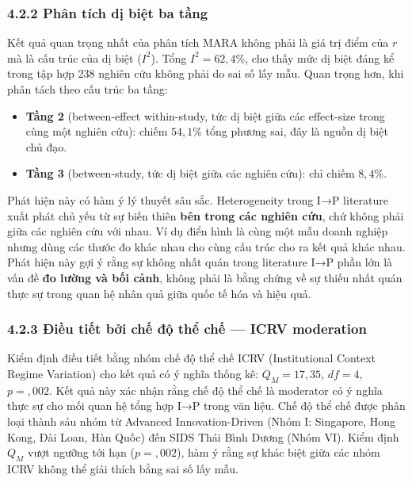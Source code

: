 \documentclass[12pt,a4paper]{article}
\providecommand{\tightlist}{\setlength{\itemsep}{0pt}\setlength{\parskip}{0pt}}
\begin{document}
\hypertarget{422-phuxe2n-tuxedch-dux1ecb-biux1ec7t-ba-tux1ea7ng}{%
\subsubsection{4.2.2 Phân tích dị biệt ba
tầng}\label{422-phuxe2n-tuxedch-dux1ecb-biux1ec7t-ba-tux1ea7ng}}

Kết quả quan trọng nhất của phân tích MARA không phải là giá trị điểm
của \(r\) mà là cấu trúc của dị biệt (\(I^2\)). Tổng \(I^2 = 62{,}4\%\),
cho thấy mức dị biệt đáng kể trong tập hợp 238 nghiên cứu không phải do
sai số lấy mẫu. Quan trọng hơn, khi phân tách theo cấu trúc ba tầng:

\begin{itemize}
\tightlist
\item
  \textbf{Tầng 2} (between-effect within-study, tức dị biệt giữa các
  effect-size trong cùng một nghiên cứu): chiếm \(54{,}1\%\) tổng phương
  sai, đây là nguồn dị biệt chủ đạo.
\item
  \textbf{Tầng 3} (between-study, tức dị biệt giữa các nghiên cứu): chỉ
  chiếm \(8{,}4\%\).
\end{itemize}

Phát hiện này có hàm ý lý thuyết sâu sắc. Heterogeneity trong I→P
literature xuất phát chủ yếu từ sự biến thiên \textbf{bên trong các
nghiên cứu}, chứ không phải giữa các nghiên cứu với nhau. Ví dụ điển
hình là cùng một mẫu doanh nghiệp nhưng dùng các thước đo khác nhau cho
cùng cấu trúc cho ra kết quả khác nhau. Phát hiện này gợi ý rằng sự
không nhất quán trong literature I→P phần lớn là vấn đề \textbf{đo lường
và bối cảnh}, không phải là bằng chứng về sự thiếu nhất quán thực sự
trong quan hệ nhân quả giữa quốc tế hóa và hiệu quả.

\hypertarget{423-ux111iux1ec1u-tiux1ebft-bux1edfi-chux1ebf-ux111ux1ed9-thux1ec3-chux1ebf--icrv-moderation}{%
\subsubsection{4.2.3 Điều tiết bởi chế độ thể chế --- ICRV
moderation}\label{423-ux111iux1ec1u-tiux1ebft-bux1edfi-chux1ebf-ux111ux1ed9-thux1ec3-chux1ebf--icrv-moderation}}

Kiểm định điều tiết bằng nhóm chế độ thể chế ICRV (Institutional Context
Regime Variation) cho kết quả có ý nghĩa thống kê: \(Q_M = 17{,}35\),
\(df = 4\), \(p = {,}002\). Kết quả này xác nhận rằng chế độ thể chế là
moderator có ý nghĩa thực sự cho mối quan hệ tổng hợp I→P trong văn
liệu. Chế độ thể chế được phân loại thành sáu nhóm từ Advanced
Innovation-Driven (Nhóm I: Singapore, Hong Kong, Đài Loan, Hàn Quốc) đến
SIDS Thái Bình Dương (Nhóm VI). Kiểm định \(Q_M\) vượt ngưỡng tới hạn
(\(p = {,}002\)), hàm ý rằng sự khác biệt giữa các nhóm ICRV không thể
giải thích bằng sai số lấy mẫu.
\end{document}
